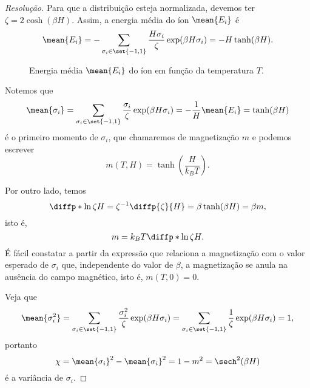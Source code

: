 \begin{proof}[Resolução]
    Para que a distribuição esteja normalizada, devemos ter \(\zeta = 2\cosh(\beta H)\). Assim, a energia média do íon \(\mean{E_i}\) é
    \begin{equation*}
        \mean{E_i} = -\sum_{\sigma_i \in \set{-1, 1}} \frac{H \sigma_i}{\zeta}\exp(\beta H \sigma_i) = -H\tanh(\beta H).
    \end{equation*}

    \begin{figure}[!h]
        \centering
        \caption{Energia média \(\mean{E_i}\) do íon em função da temperatura \(T\).}
    \end{figure}

    Notemos que
    \begin{equation*}
        \mean{\sigma_i} = \sum_{\sigma_i\in\set{-1,1}} \frac{\sigma_i}{\zeta} \exp(\beta H \sigma_i) = -\frac{1}{H}\mean{E_i} = \tanh(\beta H)
    \end{equation*}
    é o primeiro momento de \(\sigma_i\), que chamaremos de magnetização \(m\) e podemos escrever
    \begin{equation*}
        m(T, H) = \tanh\left(\frac{H}{k_B T}\right).
    \end{equation*}

    Por outro lado, temos
    \begin{equation*}
        \diffp*{\ln \zeta}{H} = \zeta^{-1} \diffp{\zeta}{H} = \beta \tanh(\beta H) = \beta m,
    \end{equation*}
    isto é,
    \begin{equation*}
        m = k_B T \diffp*{\ln \zeta}{H}.
    \end{equation*}
    É fácil constatar a partir da expressão que relaciona a magnetização com o valor esperado de \(\sigma_i\) que, independente do valor de \(\beta\), a magnetização se anula na ausência do campo magnético, isto é, \(m(T, 0) = 0\).

    Veja que
    \begin{equation*}
        \mean{\sigma_i^2} = \sum_{\sigma_i\in \set{-1,1}} \frac{\sigma_i^2}{\zeta}\exp(\beta H \sigma_i) = \sum_{\sigma_i \in \set{-1,1}} \frac{1}{\zeta} \exp(\beta H \sigma_i) = 1,
    \end{equation*}
    portanto
    \begin{equation*}
        \chi = \mean{\sigma_i}^2 - \mean{\sigma_i}^2 = 1 - m^2 = \sech^2(\beta H)
    \end{equation*}
    é a variância de \(\sigma_i\).
\end{proof}
